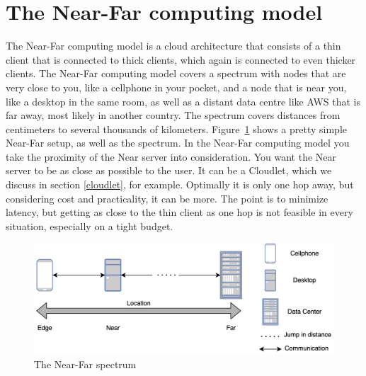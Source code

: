 
\section{The Near-Far computing model}
The Near-Far computing model is a cloud architecture that consists of a thin client that is connected to thick clients, which again is connected to even thicker clients. The Near-Far computing model covers a spectrum with nodes that are very close to you, like a cellphone in your pocket, and a node that is near you, like a desktop in the same room, as well as a distant data centre like AWS that is far away, most likely in another country. The spectrum covers distances from centimeters to several thousands of kilometers. Figure~\ref{fig:nearFarSimple} shows a pretty simple Near-Far setup, as well as the spectrum. In the Near-Far computing model you take the proximity of the Near server into consideration. You want the Near server to be as close as possible to the user. It can be a Cloudlet, which we discuss in section \ref{cloudlet}, for example. Optimally it is only one hop away, but considering cost and practicality, it can be more. The point is to minimize latency, but getting as close to the thin client as one hop is not feasible in every situation, especially on a tight budget.

\begin{figure}[t]
    \centering
    \includegraphics[scale=0.7]{chapters/background/figures/near-far-diagram.png}
    \caption{The Near-Far spectrum}
    \label{fig:nearFarSimple}
\end{figure}


